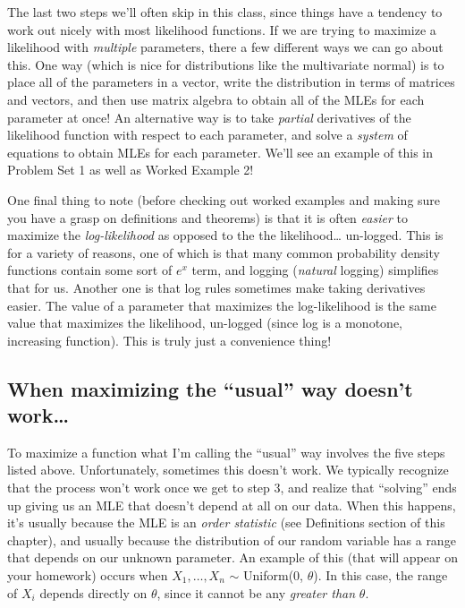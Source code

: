 \documentclass[
  letterpaper,
  DIV=11,
  numbers=noendperiod]{scrreprt}
\begin{document}
The last two steps we'll often skip in this class, since things have a
tendency to work out nicely with most likelihood functions. If we are
trying to maximize a likelihood with \emph{multiple} parameters, there a
few different ways we can go about this. One way (which is nice for
distributions like the multivariate normal) is to place all of the
parameters in a vector, write the distribution in terms of matrices and
vectors, and then use matrix algebra to obtain all of the MLEs for each
parameter at once! An alternative way is to take \emph{partial}
derivatives of the likelihood function with respect to each parameter,
and solve a \emph{system} of equations to obtain MLEs for each
parameter. We'll see an example of this in Problem Set 1 as well as
Worked Example 2!

One final thing to note (before checking out worked examples and making
sure you have a grasp on definitions and theorems) is that it is often
\emph{easier} to maximize the \emph{log-likelihood} as opposed to the
the likelihood\ldots{} un-logged. This is for a variety of reasons, one
of which is that many common probability density functions contain some
sort of \(e^x\) term, and logging (\emph{natural} logging) simplifies
that for us. Another one is that log rules sometimes make taking
derivatives easier. The value of a parameter that maximizes the
log-likelihood is the same value that maximizes the likelihood,
un-logged (since log is a monotone, increasing function). This is truly
just a convenience thing!

\hypertarget{when-maximizing-the-usual-way-doesnt-work}{%
\subsection*{When maximizing the ``usual'' way doesn't
work\ldots{}}\label{when-maximizing-the-usual-way-doesnt-work}}

To maximize a function what I'm calling the ``usual'' way involves the
five steps listed above. Unfortunately, sometimes this doesn't work. We
typically recognize that the process won't work once we get to step 3,
and realize that ``solving'' ends up giving us an MLE that doesn't
depend at all on our data. When this happens, it's usually because the
MLE is an \emph{order statistic} (see Definitions section of this
chapter), and usually because the distribution of our random variable
has a range that depends on our unknown parameter. An example of this
(that will appear on your homework) occurs when \(X_1, \dots, X_n\)
\(\sim\) Uniform(0, \(\theta\)). In this case, the range of \(X_i\)
depends directly on \(\theta\), since it cannot be any \emph{greater
than} \(\theta\).
\end{document}
